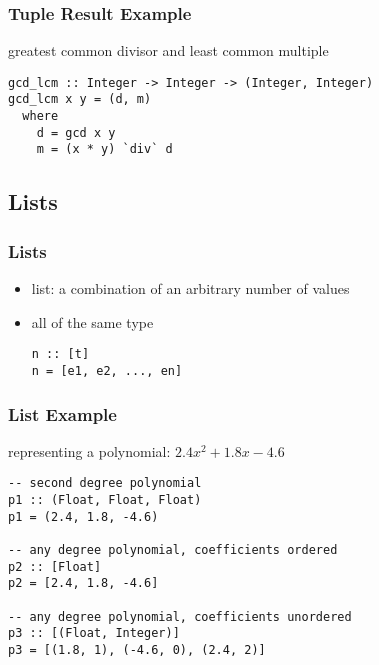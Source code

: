 \documentclass[dvipsnames]{beamer}
\theoremstyle{plain}
\begin{document}
\begin{frame}[fragile]
  \frametitle{Tuple Result Example}

  \begin{exampleblock}{greatest common divisor and least common multiple}
    \begin{lstlisting}
gcd_lcm :: Integer -> Integer -> (Integer, Integer)
gcd_lcm x y = (d, m)
  where
    d = gcd x y
    m = (x * y) `div` d
    \end{lstlisting}
  \end{exampleblock}
\end{frame}

\subsection{Lists}

\begin{frame}[fragile]
  \frametitle{Lists}

  \begin{itemize}
    \item \alert{list}: a combination of an arbitrary number of values
    \item all of the same type

    \smallskip
    \begin{lstlisting}[style=syntax]
n :: [t]
n = [e1, e2, ..., en]
    \end{lstlisting}
  \end{itemize}
\end{frame}

\begin{frame}[fragile]
  \frametitle{List Example}

  \begin{exampleblock}{representing a polynomial: $2.4x^2 + 1.8x - 4.6$}
    \begin{lstlisting}
-- second degree polynomial
p1 :: (Float, Float, Float)
p1 = (2.4, 1.8, -4.6)

-- any degree polynomial, coefficients ordered
p2 :: [Float]
p2 = [2.4, 1.8, -4.6]

-- any degree polynomial, coefficients unordered
p3 :: [(Float, Integer)]
p3 = [(1.8, 1), (-4.6, 0), (2.4, 2)]
    \end{lstlisting}
  \end{exampleblock}
\end{frame}
\end{document}
